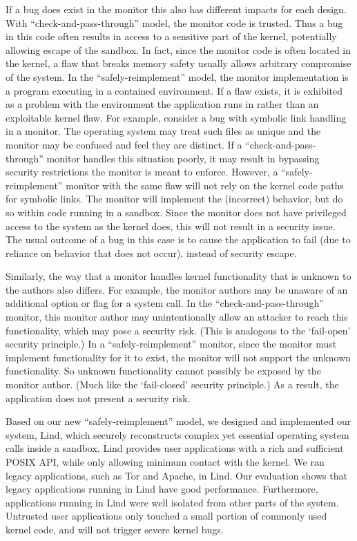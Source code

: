 \par
If a bug does exist in the monitor this also has different impacts for each design. With ``check-and-pass-through'' model, the monitor code is trusted.   Thus a bug in this code often results in access to a sensitive part of the kernel, potentially allowing escape of the sandbox. In fact, since the monitor code is often located in the kernel, a flaw that breaks memory safety usually allows arbitrary compromise of the system. In the ``safely-reimplement'' model, the monitor implementation is a program executing in a contained environment. If a flaw exists, it is exhibited as a problem with the environment the application runs in rather than an exploitable kernel flaw. For example, consider a bug with symbolic link handling in a monitor. The operating system may treat such files as unique and the monitor may be confused and feel they are distinct. If a ``check-and-pass-through'' monitor handles this situation poorly, it may result in bypassing security restrictions the monitor is meant to enforce. However, a ``safely-reimplement'' monitor with the same flaw will not rely on the kernel code paths for symbolic links. The monitor will implement the (incorrect) behavior, but do so within code running in a sandbox. Since the monitor does not have privileged access to the system as the kernel does, this will not result in a security issue. The usual outcome of a bug in this case is to cause the application to fail (due to reliance on behavior that does not occur), instead of security escape.


\par
Similarly, the way that a monitor handles kernel functionality that is unknown to the authors also differs. For example, the monitor authors may be unaware of an additional option or flag for a system call. In the ``check-and-pass-through'' monitor, this monitor author may unintentionally allow an attacker to reach this functionality, which may pose a security risk. (This is analogous to the `fail-open' security principle.)  In a ``safely-reimplement'' monitor, since the monitor must implement functionality for it to exist, the monitor will not support the unknown functionality. So unknown functionality cannot possibly be exposed by the monitor author. (Much like the `fail-closed' security principle.) As a result, the application does not present a security risk.


\par
Based on our new ``safely-reimplement'' model, we designed and implemented our system, Lind, which securely reconstructs complex yet essential operating system calls inside a sandbox. Lind provides user applications with a rich and sufficient POSIX API, while only allowing minimum contact with the kernel. We ran legacy applications, such as Tor and Apache, in Lind. Our evaluation shows that legacy applications running in Lind have good performance. Furthermore, applications running in Lind were well isolated from other parts of the system. Untrusted user applications only touched a small portion of commonly used kernel code, and will not trigger severe kernel bugs. 


